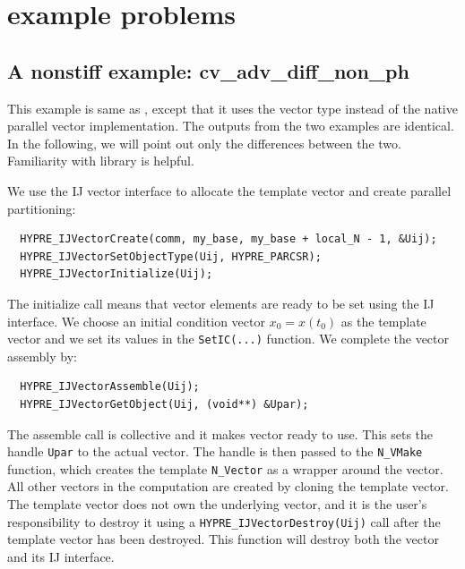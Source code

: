 \section{{\hypre} example problems}\label{s:ex_parhyp}

\subsection{A nonstiff example: cv\_adv\_diff\_non\_ph}\label{ss:cv_adv_diff_ph}

This example is same as , except that it
uses the {\hypre} vector type instead of the {\sundials} native
parallel vector implementation. 
The outputs from the two examples are identical. In the following, we will point 
out only the differences between the two. Familiarity with {\hypre} library 
\cite{hypre_um} is helpful.  

We use the {\hypre} IJ vector interface to allocate the template vector and 
create parallel partitioning: 
\begin{verbatim}
  HYPRE_IJVectorCreate(comm, my_base, my_base + local_N - 1, &Uij);
  HYPRE_IJVectorSetObjectType(Uij, HYPRE_PARCSR);
  HYPRE_IJVectorInitialize(Uij);
\end{verbatim}
The initialize call means that vector elements are ready to be set using 
the IJ interface. We choose an initial condition vector $x_0 = x(t_0)$ as the 
template vector and we set its values in the \verb|SetIC(...)| function. We 
complete the {\hypre} vector assembly by:
\begin{verbatim}
  HYPRE_IJVectorAssemble(Uij);
  HYPRE_IJVectorGetObject(Uij, (void**) &Upar);
\end{verbatim}
The assemble call is collective and it makes {\hypre} vector ready to use. 
This sets the handle \verb|Upar| to the actual {\hypre} vector. 
The handle is then passed to the \verb|N_VMake| function, which creates 
the template \verb|N_Vector| as a wrapper around the {\hypre} vector. 
All other vectors in the computation are created by cloning the template 
vector. The template vector does not own the underlying {\hypre} vector, 
and it is the user's responsibility to destroy it using a
\verb|HYPRE_IJVectorDestroy(Uij)| call after the template vector has been 
destroyed. This function will destroy both the {\hypre} vector and its IJ 
interface.

